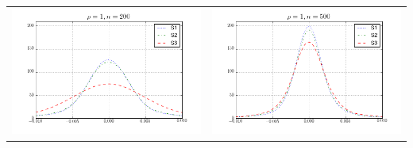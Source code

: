 \begin{table}[!ht]
{\begin{tabular}{c c}
\includegraphics[width=8cm]{theta_density_200_1} & \includegraphics[width=8cm]{theta_density_500_1} \\
\end{tabular}
}
\end{table}



\clearpage

